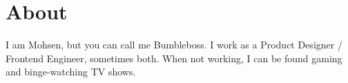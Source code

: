 \section*{About}
I am Mohsen, but you can call me \mbox{Bumbleboss}. I work as a Product Designer / Frontend Engineer, sometimes both. When not working, I can be found gaming and binge-watching TV shows.